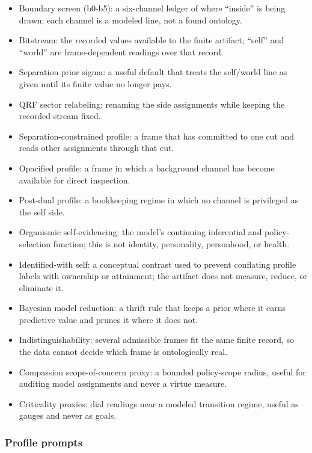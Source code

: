 \documentclass[
]{article}
\providecommand{\tightlist}{%
  \setlength{\itemsep}{0pt}\setlength{\parskip}{0pt}}
\begin{document}
\begin{itemize}
\tightlist
\item
  Boundary screen (b0-b5): a six-channel ledger of where ``inside'' is
  being drawn; each channel is a modeled line, not a found ontology.
\item
  Bitstream: the recorded values available to the finite artifact;
  ``self'' and ``world'' are frame-dependent readings over that record.
\item
  Separation prior sigma: a useful default that treats the self/world
  line as given until its finite value no longer pays.
\item
  QRF sector relabeling: renaming the side assignments while keeping the
  recorded stream fixed.
\item
  Separation-constrained profile: a frame that has committed to one cut
  and reads other assignments through that cut.
\item
  Opacified profile: a frame in which a background channel has become
  available for direct inspection.
\item
  Post-dual profile: a bookkeeping regime in which no channel is
  privileged as the self side.
\item
  Organismic self-evidencing: the model's continuing inferential and
  policy-selection function; this is not identity, personality,
  personhood, or health.
\item
  Identified-with self: a conceptual contrast used to prevent conflating
  profile labels with ownership or attainment; the artifact does not
  measure, reduce, or eliminate it.
\item
  Bayesian model reduction: a thrift rule that keeps a prior where it
  earns predictive value and prunes it where it does not.
\item
  Indistinguishability: several admissible frames fit the same finite
  record, so the data cannot decide which frame is ontologically real.
\item
  Compassion scope-of-concern proxy: a bounded policy-scope radius,
  useful for auditing model assignments and never a virtue measure.
\item
  Criticality proxies: dial readings near a modeled transition regime,
  useful as gauges and never as goals.
\end{itemize}

\subsubsection{Profile prompts}\label{profile-prompts}
\end{document}
